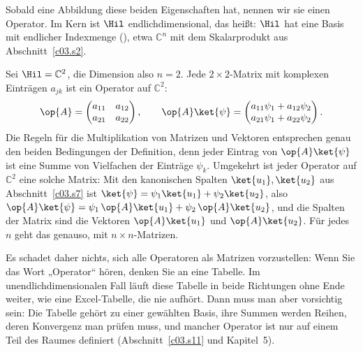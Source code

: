 
Sobald eine Abbildung diese beiden Eigenschaften hat, nennen wir sie einen Operator. Im Kern ist
$\Hil$ endlichdimensional, das heißt: $\Hil$ hat eine Basis mit endlicher Indexmenge
(), etwa $\mathbb{C}^n$ mit dem Skalarprodukt aus Abschnitt~\ref{c03.s2}.

\begin{example}\label{c03.ex.matrix}
  Sei $\Hil = \mathbb{C}^2$, die Dimension also $n = 2$. Jede $2 \times 2$-Matrix mit komplexen
  Einträgen $a_{jk}$ ist ein Operator auf $\mathbb{C}^2$:
  \begin{equation}\label{c03.eq.matrix}
    \op{A} = \begin{pmatrix} a_{11} & a_{12} \\ a_{21} & a_{22} \end{pmatrix} ,
    \qquad
    \op{A}\ket{\psi} = \begin{pmatrix} a_{11}\psi_1 + a_{12}\psi_2 \\ a_{21}\psi_1 + a_{22}\psi_2 \end{pmatrix} .
  \end{equation}
  Die Regeln für die Multiplikation von Matrizen und Vektoren entsprechen genau den beiden
  Bedingungen der Definition, denn jeder Eintrag von $\op{A}\ket{\psi}$ ist eine Summe von
  Vielfachen der Einträge $\psi_k$. Umgekehrt ist jeder Operator auf $\mathbb{C}^2$ eine solche
  Matrix: Mit den kanonischen Spalten $\ket{u_1}, \ket{u_2}$ aus Abschnitt~\ref{c03.s7} ist
  $\ket{\psi} = \psi_1 \ket{u_1} + \psi_2 \ket{u_2}$, also
  $\op{A}\ket{\psi} = \psi_1\, \op{A}\ket{u_1} + \psi_2\, \op{A}\ket{u_2}$, und die Spalten der
  Matrix sind die Vektoren $\op{A}\ket{u_1}$ und $\op{A}\ket{u_2}$. Für jedes $n$ geht das
  genauso, mit $n \times n$-Matrizen.
\end{example}

Es schadet daher nichts, sich alle Operatoren als Matrizen vorzustellen: Wenn Sie das Wort
„Operator“ hören, denken Sie an eine Tabelle. Im unendlichdimensionalen Fall läuft diese Tabelle
in beide Richtungen ohne Ende weiter, wie eine Excel-Tabelle, die nie aufhört. Dann muss man
aber vorsichtig sein: Die Tabelle gehört zu einer gewählten Basis, ihre Summen werden Reihen,
deren Konvergenz man prüfen muss, und mancher Operator ist nur auf einem Teil des Raumes
definiert (Abschnitt~\ref{c03.s11} und Kapitel~5).


